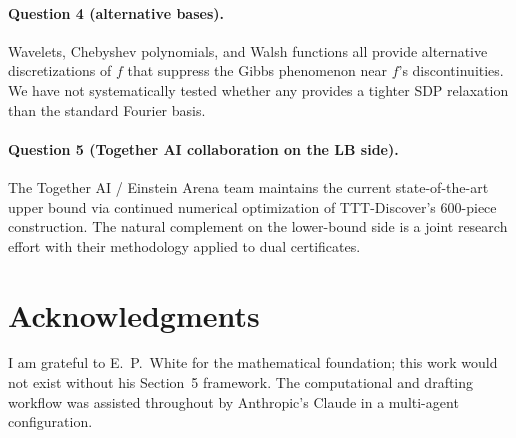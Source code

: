 \documentclass[11pt]{article}
\theoremstyle{plain}
\theoremstyle{definition}
\begin{document}
\paragraph{Question 4 (alternative bases).}
Wavelets, Chebyshev polynomials, and Walsh functions all provide
alternative discretizations of $f$ that suppress the Gibbs phenomenon
near $f$'s discontinuities. We have not systematically tested whether
any provides a tighter SDP relaxation than the standard Fourier basis.

\paragraph{Question 5 (Together AI collaboration on the LB side).}
The Together AI / Einstein Arena team \cite{TogetherComputer2026,
TTTDiscover2026} maintains the current state-of-the-art upper bound
via continued numerical optimization of TTT-Discover's 600-piece
construction. The natural complement on the lower-bound side is a
joint research effort with their methodology applied to dual
certificates.

\section{Acknowledgments}

I am grateful to E.~P.~White for the mathematical foundation; this
work would not exist without his Section~5 framework. The
computational and drafting workflow was assisted throughout by
Anthropic's Claude in a multi-agent configuration.
\end{document}

